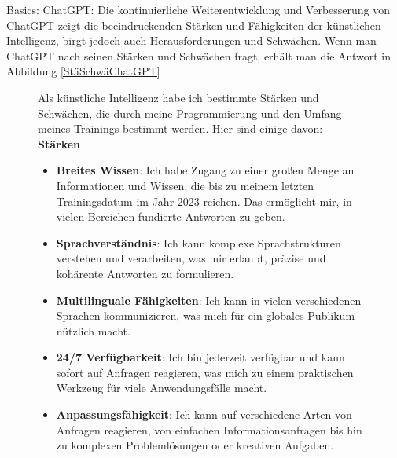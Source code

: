 Basics:
    ChatGPT:
    Die kontinuierliche Weiterentwicklung und Verbesserung von ChatGPT zeigt die beeindruckenden Stärken und Fähigkeiten der 
    künstlichen Intelligenz, birgt jedoch auch Herausforderungen und Schwächen. Wenn man ChatGPT nach seinen Stärken und Schwächen 
    fragt, erhält man die Antwort in Abbildung \ref{StäSchwäChatGPT}
    
    \begin{figure} 
        \begin{tcolorbox}[colback=gray!20, colframe=gray!20, boxrule=0pt, sharp corners] 
        Als künstliche Intelligenz habe ich bestimmte Stärken und Schwächen, die durch meine Programmierung und den Umfang meines Trainings bestimmt werden. Hier sind einige davon:\\
    
        \textbf{Stärken}
        \begin{itemize}
            \item \textbf{Breites Wissen}: Ich habe Zugang zu einer großen Menge an Informationen und Wissen, die bis zu meinem letzten Trainingsdatum im Jahr 2023 reichen. Das ermöglicht mir, in vielen Bereichen fundierte Antworten zu geben.
            \item \textbf{Sprachverständnis}: Ich kann komplexe Sprachstrukturen verstehen und verarbeiten, was mir erlaubt, präzise und kohärente Antworten zu formulieren.
            \item \textbf{Multilinguale Fähigkeiten}: Ich kann in vielen verschiedenen Sprachen kommunizieren, was mich für ein globales Publikum nützlich macht.
            \item \textbf{24/7 Verfügbarkeit}: Ich bin jederzeit verfügbar und kann sofort auf Anfragen reagieren, was mich zu einem praktischen Werkzeug für viele Anwendungsfälle macht.
            \item \textbf{Anpassungsfähigkeit}: Ich kann auf verschiedene Arten von Anfragen reagieren, von einfachen Informationsanfragen bis hin zu komplexen Problemlösungen oder kreativen Aufgaben.
        \end{itemize}
    

\end{tcolorbox}
\end{figure}
